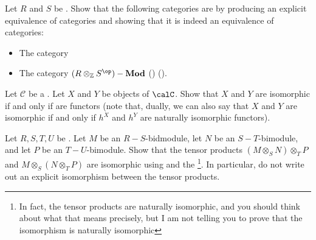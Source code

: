\begin{problem}
    Let $R$ and $S$ be . Show that the following categories are  by producing an explicit equivalence of categories and showing that it is indeed an equivalence of categories:
    \begin{itemize}
        \item The category 
        \item The category $(R \otimes_\mathbb{Z} S^{\op})-\mathbf{Mod}$ () ().
    \end{itemize}
\end{problem}

\begin{problem} \label{problem:yoneda_phliosophy}
    Let $\mathcal{C}$ be a . Let $X$ and $Y$ be objects of $\calC$. 
    Show that $X$ and $Y$ are isomorphic if and only if  are  functors (note that, dually, we can also say that $X$ and $Y$ are isomorphic if and only if $h^X$ and $h^Y$ are naturally isomorphic functors).
\end{problem}

\begin{problem}
    Let $R,S,T,U$ be . Let $M$ be an $R-S$-bidmodule, let $N$ be an $S-T$-bimodule, and let $P$ be an $T-U$-bimodule. Show that the tensor products $(M \otimes_S N) \otimes_T P$ and $M \otimes_S (N \otimes_T P)$ are isomorphic using  and the \footnote{In fact, the tensor products are naturally isomorphic, and you should think about what that means precisely, but I am not telling you to prove that the isomorphism is naturally isomorphic}. In particular, do not write out an explicit isomorphism between the tensor products.
\end{problem}


